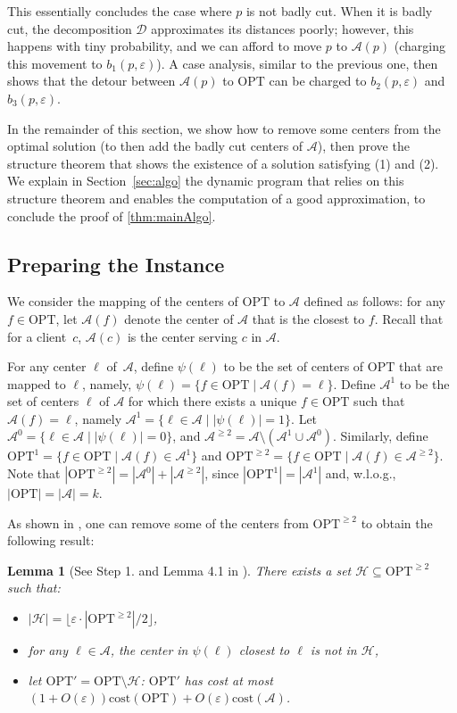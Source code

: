 \documentclass[11pt]{article}
\newtheorem{lemma}[theorem]{Lemma}
\newcommand{\opt}{\text{OPT}}
\newcommand{\eps}{\varepsilon}
\newcommand{\cost}{\mathrm{cost}}
\newcommand{\calA}{\mathcal A}
\newcommand{\calD}{\mathcal {D}}
\newcommand{\calL}{\mathcal{A}}
\newcommand{\globalS}{\opt}
\newcommand{\calH}{\mathcal{H}}
\begin{document}
This essentially concludes the case where $p$ is not badly cut. When it is badly cut, the decomposition $\calD$ approximates its distances poorly; however, this happens with tiny probability, and we can afford to move $p$ to $\calA(p)$ (charging this movement to $b_1(p, \eps)$). A case analysis, similar to the previous one, then shows that the detour between $\calA(p)$ to $\opt$ can be charged to $b_2(p, \eps)$ and $b_3(p, \eps)$.

In the remainder of this section, we show how to remove some centers from the optimal solution (to then add the badly cut centers of $\calA$), then prove the structure theorem that shows the existence of a solution satisfying (1) and (2). 
We explain in Section~\ref{sec:algo} the dynamic program that relies on this structure theorem and enables the computation of a good approximation, to conclude the proof of \cref{thm:mainAlgo}.

\subsection{Preparing the Instance}\label{sec:prepareInstance}
We consider the mapping of the
centers of $\globalS$ to $\calL$ defined as follows: for 
any $f \in \globalS$, let $\calL(f)$  denote the center of $\calL$ that is the closest 
to $f$. Recall that for a client~$c$, $\calL(c)$ is the center serving $c$ in $\calL$.

For any center $\ell$ of~$\calL$, define $\psi(\ell)$ to be the set of centers 
of $\globalS$ that are mapped to $\ell$, namely, $\psi(\ell) = \{f \in \opt \mid 
\calL(f) = \ell \}$. 
Define $ \calL^1$ to be the set of centers $\ell$ of $\calL$ for 
which there exists a unique $f \in \globalS$ such that $\calL(f) = \ell$, namely 
$ \calL^1 = \{\ell\in \calL \mid |\psi(\ell)| = 1\}$. Let $ \calL^0 = \{ \ell\in \calL \mid 
|\psi(\ell)| = 
0\}$, and $ \calL^{\geq 2} = \calL \setminus( \calL^1 \cup \calL^0)$. 
Similarly, define 
$\globalS^1 = \{f \in \globalS \mid \calL(f) \in \calL^1\}$ 
 and $\globalS^{\geq 2} = \{ f \in \globalS \mid 
\calL(f) \in \calL^{\geq 2}\}$. Note that $|\globalS^{\geq 2}| = | \calL^0|+| \calL^{\geq 2}|$, since 
$|\globalS^1|=| \calL^1|$ and, w.l.o.g., $|\globalS|=| \calL|=k$.

As shown in \cite{jacm}, one can remove some of the centers from $\globalS^{\geq 2}$ to obtain the following result:
\begin{lemma}[See Step 1. and Lemma 4.1 in \cite{jacm}]\label{lem:coststep1}
There exists a set $\calH \subseteq \globalS^{\geq 2}$ such that: 
\begin{itemize}
    \item $|\calH| = \lfloor \eps\cdot  |\globalS^{\geq 2}| / 2\rfloor$,
    \item for any $\ell \in \calL$, the center in $\psi(\ell)$ closest to $\ell$ is not in $\calH$, 
    \item let $\opt' = \opt \setminus \calH$: $\opt'$ has cost at most $(1+O(\eps))\cost(\globalS) + O(\eps)\cost( \calL)$.
\end{itemize}
\end{lemma}
\end{document}
